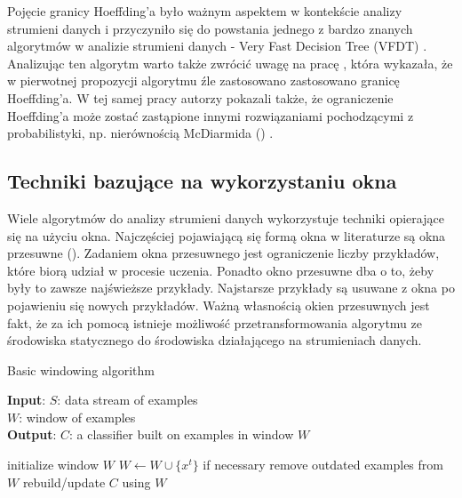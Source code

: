 Pojęcie granicy Hoeffding'a było ważnym aspektem w kontekście analizy strumieni danych i przyczyniło się do powstania jednego z bardzo znanych algorytmów w analizie strumieni danych - Very Fast Decision Tree (VFDT) \cite{Article:VFDT}. Analizując ten algorytm warto także zwrócić uwagę na pracę \cite{Article:Rutkowski}, która wykazała, że w pierwotnej propozycji algorytmu źle zastosowano zastosowano granicę Hoeffding'a. W tej samej pracy autorzy pokazali także, że ograniczenie Hoeffding'a może zostać zastąpione innymi rozwiązaniami pochodzącymi z probabilistyki, np. nierównością McDiarmida () \cite{Article:Rutkowski}.

\subsection{Techniki bazujące na wykorzystaniu okna}

\noindent Wiele algorytmów do analizy strumieni danych wykorzystuje techniki opierające się na użyciu okna. Najczęściej pojawiającą się formą okna w literaturze są okna przesuwne (). Zadaniem okna przesuwnego jest ograniczenie liczby przykładów, które biorą udział w procesie uczenia. Ponadto okno przesuwne dba o to, żeby były to zawsze najświeższe przykłady. Najstarsze przykłady są usuwane z okna po pojawieniu się nowych przykładów. Ważną własnością okien przesuwnych jest fakt, że za ich pomocą istnieje możliwość przetransformowania algorytmu ze środowiska statycznego do środowiska działającego na strumieniach danych.

\begin{algorithm}
    \caption{Basic windowing algorithm \cite{BrzezPhd2015}}\label{Algorithm:Window}
    \textbf{Input}: $S$: data stream of examples \\
    \hspace*{12mm} $W$: window of examples \\
    \textbf{Output}: $C$: a classifier built on examples in window $W$ \\
    \begin{algorithmic}[1]
    \State initialize window $W$
    \State $W \gets W \cup \{x^t\}$
    \State if necessary remove outdated examples from $W$
    \State rebuild/update $C$ using $W$
    \EndFor
    \end{algorithmic}
\end{algorithm}

